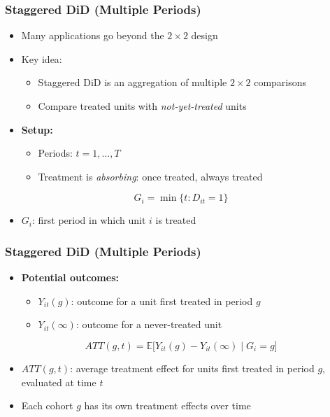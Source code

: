 \documentclass[12pt, compress]{beamer}
\begin{document}
\begin{frame}
	\frametitle{Staggered DiD (Multiple Periods)}

\begin{itemize}
	\item Many applications go beyond the \(2 \times 2\) design
	
	\medskip
	
	\item Key idea:
	\begin{itemize}
		\item Staggered DiD is an aggregation of multiple \(2 \times 2\) comparisons
		\item Compare treated units with \textit{not-yet-treated} units \citep{baker2025did_guide}
	\end{itemize}
	
	\medskip
	
	\item \textbf{Setup:}
	\begin{itemize}
		\item Periods: \(t = 1, \dots, T\)
		\item Treatment is \textit{absorbing}: once treated, always treated
	\end{itemize}
\end{itemize}

\medskip

\[
G_i = \min\{t : D_{it} = 1\}
\]

\begin{itemize}
	\item \(G_i\): first period in which unit \(i\) is treated
\end{itemize}

\end{frame}

\begin{frame}
	\frametitle{Staggered DiD (Multiple Periods)}

\begin{itemize}
	\item \textbf{Potential outcomes:}
	\begin{itemize}
		\item \(Y_{it}(g)\): outcome for a unit first treated in period \(g\)
		\item \(Y_{it}(\infty)\): outcome for a never-treated unit
	\end{itemize}
\end{itemize}

\medskip

\[
ATT(g,t) = \mathbb{E}\big[ Y_{it}(g) - Y_{it}(\infty) \mid G_i = g \big]
\]

\begin{itemize}
	\item \(ATT(g,t)\): average treatment effect for units first treated in period \(g\), evaluated at time \(t\)
	
	\medskip
	
	\item Each cohort \(g\) has its own treatment effects over time
\end{itemize}

\end{frame}
\end{document}

